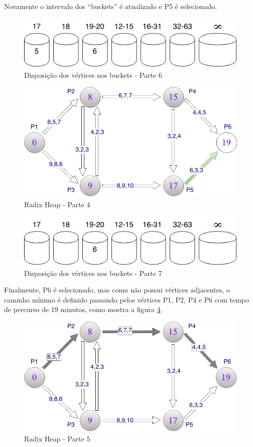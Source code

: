 Novamente o intervalo dos ``buckets'' é atualizado e P5 é selecionado.
\begin{figure}[htbp]
\centering
 \includegraphics[width=.50\textwidth]{figuras/buckets6.png}
\caption{Disposição dos vértices nos buckets - Parte 6}
\label{fig:buckets6}
\end{figure}
\FloatBarrier
\begin{figure}[htbp]
\centering
 \includegraphics[width=.50\textwidth]{figuras/limitesup4.png}
\caption{Radix Heap - Parte 4}
\label{fig:limitesup4}
\end{figure}
\FloatBarrier
\begin{figure}[htbp]
\centering
 \includegraphics[width=.50\textwidth]{figuras/buckets7.png}
\caption{Disposição dos vértices nos buckets - Parte 7}
\label{fig:buckets7}
\end{figure}
\FloatBarrier

Finalmente, P6 é selecionado, mas como não possui vértices adjacentes, o caminho mínimo é definido passando
pelos vértices P1, P2, P4 e P6 com tempo de percurso de 19 minutos, como mostra a figura \ref{fig:limitesup5}.

\begin{figure}[htbp]
\centering
 \includegraphics[width=.50\textwidth]{figuras/limitesup5.png}
\caption{Radix Heap - Parte 5}
\label{fig:limitesup5}
\end{figure}
\FloatBarrier

